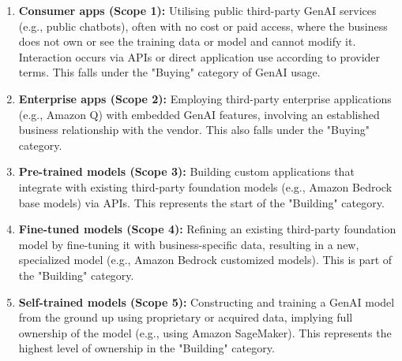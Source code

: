 \begin{enumerate}
    \item \textbf{Consumer apps (Scope 1):} Utilising public third-party GenAI services (e.g., public chatbots), often with no cost or paid access, where the business does not own or see the training data or model and cannot modify it. Interaction occurs via APIs or direct application use according to provider terms\cite{noauthor_securing_2023}\cite{noauthor_securing_nodate}. This falls under the "Buying" category of GenAI usage\cite{noauthor_securing_nodate}.
    \item \textbf{Enterprise apps (Scope 2):} Employing third-party enterprise applications (e.g., Amazon Q) with embedded GenAI features, involving an established business relationship with the vendor\cite{noauthor_securing_2023}\cite{noauthor_securing_nodate}. This also falls under the "Buying" category\cite{noauthor_securing_nodate}.
    \item \textbf{Pre-trained models (Scope 3):} Building custom applications that integrate with existing third-party foundation models (e.g., Amazon Bedrock base models) via APIs\cite{noauthor_securing_2023}\cite{noauthor_securing_nodate}. This represents the start of the "Building" category\cite{noauthor_securing_nodate}.
    \item \textbf{Fine-tuned models (Scope 4):} Refining an existing third-party foundation model by fine-tuning it with business-specific data, resulting in a new, specialized model (e.g., Amazon Bedrock customized models)\cite{noauthor_securing_2023}\cite{noauthor_securing_nodate}. This is part of the "Building" category\cite{noauthor_securing_nodate}.
    \item \textbf{Self-trained models (Scope 5):} Constructing and training a GenAI model from the ground up using proprietary or acquired data, implying full ownership of the model (e.g., using Amazon SageMaker)\cite{noauthor_securing_2023}\cite{noauthor_securing_nodate}. This represents the highest level of ownership in the "Building" category\cite{noauthor_securing_nodate}.
\end{enumerate}
